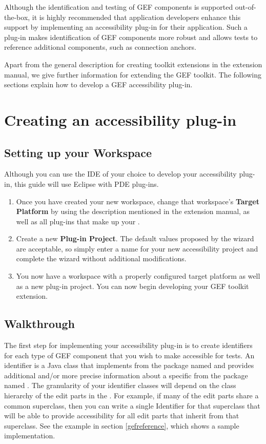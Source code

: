 Although the identification and testing of GEF components is supported
out-of-the-box, it is highly recommended that application developers enhance
this support by implementing an accessibility plug-in for their application. Such a
plug-in makes identification of GEF components more robust and allows 
tests to reference additional components, such as connection anchors.

Apart from the general description for creating toolkit extensions in the
extension manual, we give further information for extending the GEF toolkit. The
following sections explain how to develop a GEF accessibility plug-in.

\section{Creating an accessibility plug-in}

\subsection{Setting up your Workspace}
Although you can use the IDE of your choice to develop your accessibility
plug-in, this guide will use Eclipse with PDE plug-ins.

\begin{enumerate}
\item Once you have created your new workspace, change that workspace's
\textbf{Target Platform} by using the description mentioned in the extension
manual, as well as all plug-ins that make up your \gdaut{}.

\item Create a new \textbf{Plug-in Project}. The default values proposed by the
wizard are acceptable, so simply enter a name for your new accessibility project
and complete the wizard without additional modifications.

\item You now have a workspace with a properly configured target platform as
well as a new plug-in project. You can now begin developing your GEF
toolkit extension.
\end{enumerate}

\subsection{Walkthrough}
The first step for implementing your accessibility plug-in is to create
identifiers for each type of GEF component that you wish to make accessible for
 tests. An identifier is a Java class that implements
 from the package named
 and provides 
additional and/or more precise information about a specific 
from the package named . The granularity of your
identifier classes will depend on the class hierarchy of the edit parts in the
\gdaut{}. For example, if many of the edit parts share a common superclass, then
you can write a single Identifier for that superclass that will be able to
provide accessibility for all edit parts that inherit from that superclass. See
the example in section \ref{gefreference}, which shows a sample implementation.


